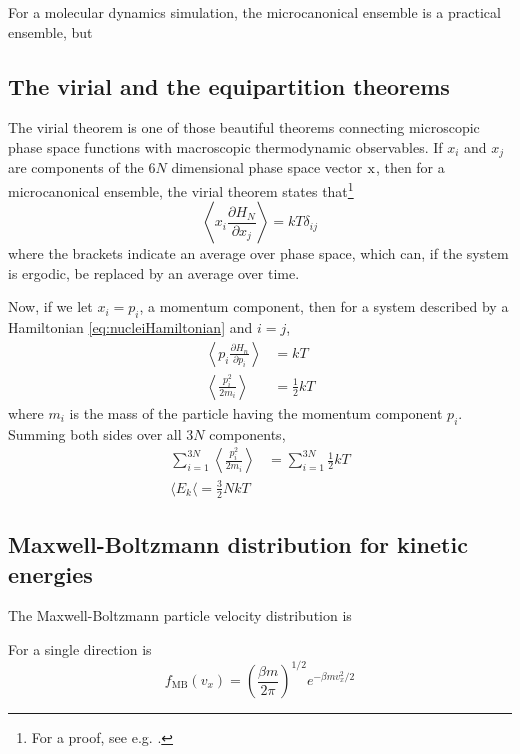 \documentclass[11pt,bibliography=totoc,index=totoc]{scrbook}   %
\begin{document}
For a molecular dynamics simulation, the microcanonical ensemble is a practical ensemble, but  

\subsection{The virial and the equipartition theorems}

The virial theorem is one of those beautiful theorems connecting microscopic phase space functions with macroscopic thermodynamic observables. 
If $x_i$ and $x_j$ are components of the $6N$ dimensional phase space vector $\mathrm{x}$, 
then for a microcanonical ensemble, the virial theorem states that\footnote{For a proof, see e.g. \cite[81]{Tuckerman:2010}.}
\begin{equation}
  \left\langle x_i \frac{\partial H_N}{\partial x_j}\right\rangle = kT \delta_{ij}
\end{equation}
where the brackets indicate an average over phase space, which can, if the system is ergodic, be replaced by an average over time.

Now, if we let $x_i = p_i$, a momentum component, then for a system described by a Hamiltonian \eqref{eq:nucleiHamiltonian} and $i=j$,
\begin{align}
  \left\langle p_i \frac{\partial H_n}{\partial p_i}\right\rangle &= kT  \\
  \left\langle \frac{p_i^2}{2m_i}\right\rangle &= \frac12kT
\end{align}
where $m_i$ is the mass of the particle having the momentum component $p_i$. 
Summing both sides over all $3N$ components, 
\begin{align}
  \sum_{i=1}^{3N} \left\langle\frac{p_i^2}{2m_i} \right\rangle &= \sum_{i=1}^{3N} \frac12 kT \\
  \langle E_k \langle = \frac32 NkT
\end{align}




\subsection{Maxwell-Boltzmann distribution for kinetic energies}


The Maxwell-Boltzmann particle velocity distribution is

For a single direction is
\begin{equation}
  f_{\text{MB}}(v_x) = \left(\frac{\beta m}{2\pi }\right)^{1/2} e^{-\beta m v_x^2 / 2}
  \label{eq:maxboltz-vdist-1D}
\end{equation}
\end{document}
